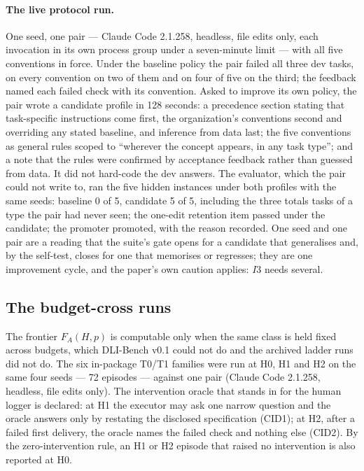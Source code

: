\documentclass[11pt]{article}
\theoremstyle{definition}
\begin{document}
\paragraph{The live protocol run.} One seed, one pair --- Claude Code 2.1.258, headless, file edits only, each invocation in its own process group under a seven-minute limit --- with all five conventions in force. Under the baseline policy the pair failed all three dev tasks, on every convention on two of them and on four of five on the third; the feedback named each failed check with its convention. Asked to improve its own policy, the pair wrote a candidate profile in 128 seconds: a precedence section stating that task-specific instructions come first, the organization's conventions second and overriding any stated baseline, and inference from data last; the five conventions as general rules scoped to ``wherever the concept appears, in any task type''; and a note that the rules were confirmed by acceptance feedback rather than guessed from data. It did not hard-code the dev answers. The evaluator, which the pair could not write to, ran the five hidden instances under both profiles with the same seeds: baseline 0 of 5, candidate 5 of 5, including the three totals tasks of a type the pair had never seen; the one-edit retention item passed under the candidate; the promoter promoted, with the reason recorded. One seed and one pair are a reading that the suite's gate opens for a candidate that generalises and, by the self-test, closes for one that memorises or regresses; they are one improvement cycle, and the paper's own caution applies: $I3$ needs several.

\subsection{The budget-cross runs}\label{sec:budgetcross}

The frontier $F_A(H,p)$ is computable only when the same class is held fixed across budgets, which DLI-Bench v0.1 could not do and the archived ladder runs did not do. The six in-package T0/T1 families were run at H0, H1 and H2 on the same four seeds --- 72 episodes --- against one pair (Claude Code 2.1.258, headless, file edits only). The intervention oracle that stands in for the human logger is declared: at H1 the executor may ask one narrow question and the oracle answers only by restating the disclosed specification (CID1); at H2, after a failed first delivery, the oracle names the failed check and nothing else (CID2). By the zero-intervention rule, an H1 or H2 episode that raised no intervention is also reported at H0.
\end{document}
